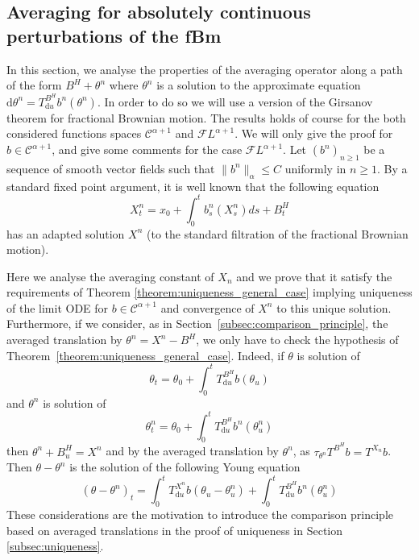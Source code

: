 \documentclass[a4paper,11pt]{article}
\newcommand{\mathd}{\mathrm{d}}
\newcommand{\CC}{\mathscr C}
\newcommand{\CF}{\mathscr F}
\begin{document}
\subsection{Averaging for absolutely continuous perturbations of the fBm}\label{sec:girsanov}

In this section, we analyse the properties of the averaging operator along a
path of the form $B^{H} + \theta^{n}$ where $\theta^{n}$ is a solution to the
approximate equation $\mathd \theta^{n} =T^{B^{H}}_{\mathd u} b^{n} (
\theta^{n} )$. In order to do so we will use a version of the Girsanov theorem
for fractional Brownian motion. The results holds of course for the both
considered functions spaces $\CC^{\alpha +1}$ and $\CF L^{\alpha +1}$. We will
only give the proof for $b \in \CC^{\alpha +1}$, and give some comments for
the case $\CF L^{\alpha +1}$. Let $(b^{n} )_{n \ge 1}$ be a sequence of smooth
vector fields such that $\| b^{n} \|_{\alpha} \leqslant C$ uniformly in $n \ge
1$. By a standard fixed point argument, it is well known that the following
equation
\begin{equation}
  X^{n}_{t} =x_{0} + \int_{0}^{t} b^{n}_{s} (X^{n}_{s} ) ds+B^{H}_{t}
\end{equation}
has an adapted solution $X^{n}$ (to the standard filtration of the fractional
Brownian motion).



Here we analyse the averaging constant of $X_{n}$ and we prove that it
satisfy the requirements of Theorem \ref{theorem:uniqueness_general_case}
implying uniqueness of the limit ODE for $b \in \CC^{\alpha +1}$ and
convergence of $X^{n}$ to this unique solution. Furthermore, if we consider,
as in Section~\ref{subsec:comparison_principle}, the averaged translation by
$\theta^{n} =X^{n} -B^{H}$, we only have to check the hypothesis of
Theorem~\ref{theorem:uniqueness_general_case}. Indeed, if $\theta$ is solution
of
\[ \theta_{t} = \theta_{0} + \int_{0}^{t} T^{B^{H}}_{\mathd u} b ( \theta_{u}
   ) \]
and $\theta^{n}$ is solution of
\[ \theta_{t}^{n} = \theta_{0} + \int_{0}^{t} T^{B^{H}}_{\mathd u} b^{n} (
   \theta^{n}_{u} ) \]
then $\theta^{n} +B^{H}_{u} =X^{n}$ and by the averaged translation by
$\theta^{n}$, as $\tau_{\theta^{n}} T^{B^{H}} b=T^{X_{n}} b$. Then $\theta -
\theta^{n}$ is the solution of the following Young equation
\[ ( \theta - \theta^{n} )_{t} = \int_{0}^{t} T^{X^{n}}_{\mathd u} b (
   \theta_{u} - \theta^{n}_{u} ) + \int_{0}^{t} T^{B^{H}}_{\mathd u} b^{n} (
   \theta^{n}_{u} ) \]
These considerations are the motivation to introduce the comparison principle
based on averaged translations in the proof of uniqueness in Section
\ref{subsec:uniqueness}.
\end{document}
